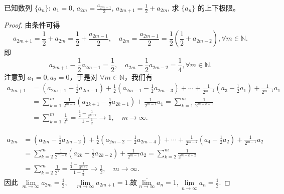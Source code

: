 \documentclass[../../main.tex]{subfiles}%
\begin{document}
\begin{example}
已知数列 $\{a_n\}$: $a_1 = 0$, $a_{2m} = \frac{a_{2m-1}}{2}$, $a_{2m+1} = \frac{1}{2} + a_{2m}$, 求 $\{a_n\}$ 的上下极限。
\end{example}
\begin{proof}
由条件可得  
\[
a_{2m+1}=\frac{1}{2}+a_{2m}=\frac{1}{2}+\frac{a_{2m-1}}{2},\quad a_{2m}=\frac{a_{2m-1}}{2}=\frac{1}{2}\left( \frac{1}{2}+a_{2m-2} \right),\forall m\in \mathbb{N}.
\]
即  
\[
a_{2m+1}-\frac{1}{2}a_{2m-1}=\frac{1}{2},\quad a_{2m}-\frac{1}{2}a_{2m-2}=\frac{1}{4},\forall m\in \mathbb{N}.
\]
注意到 $a_1=0,a_2=0$，于是对 $\forall m\in \mathbb{N}$，我们有  
\begin{align*}
a_{2m+1}&=\left( a_{2m+1}-\frac{1}{2}a_{2m-1} \right) +\frac{1}{2}\left( a_{2m-1}-\frac{1}{2}a_{2m-3} \right) +\cdots +\frac{1}{2^{m-2}}\left( a_3-\frac{1}{2}a_1 \right) +\frac{1}{2^{m-1}}a_1 \\
&=\sum_{k=1}^m{\frac{1}{2^{m-k}}\left( a_{2k+1}-\frac{1}{2}a_{2k-1} \right)}+\frac{1}{2^{m-1}}a_1=\sum_{k=1}^m{\frac{1}{2^{m-k+1}}} \\
&=\sum_{k=1}^m{\frac{1}{2^k}}=\frac{\frac{1}{2}-\frac{1}{2^{m+1}}}{1-\frac{1}{2}}\rightarrow 1,\quad m\rightarrow \infty.
\end{align*}

\begin{align*}
a_{2m}&=\left( a_{2m}-\frac{1}{2}a_{2m-2} \right) +\frac{1}{2}\left( a_{2m-2}-\frac{1}{2}a_{2m-4} \right) +\cdots +\frac{1}{2^{m-2}}\left( a_4-\frac{1}{2}a_2 \right) +\frac{1}{2^{m-1}}a_2 \\
&=\sum_{k=2}^m{\frac{1}{2^{m-k}}\left( a_{2k}-\frac{1}{2}a_{2k-2} \right)}+\frac{1}{2^{m-1}}a_2=\sum_{k=2}^m{\frac{1}{2^{m-k+2}}} \\
&=\sum_{k=2}^m{\frac{1}{2^k}}=\frac{\frac{1}{4}-\frac{1}{2^{m+2}}}{1-\frac{1}{2}}\rightarrow \frac{1}{2},\quad m\rightarrow \infty.
\end{align*}
因此  
$\underset{m\rightarrow \infty}{\lim}a_{2m}=\frac{1}{2},\quad \underset{m\rightarrow \infty}{\lim}a_{2m+1}=1$.故$\underset{n\rightarrow \infty}{\overline{\lim }}a_n=1,\underset{n\rightarrow \infty}{\underline{\lim }}a_n=\frac{1}{2}.$
\end{proof}
\end{document}
